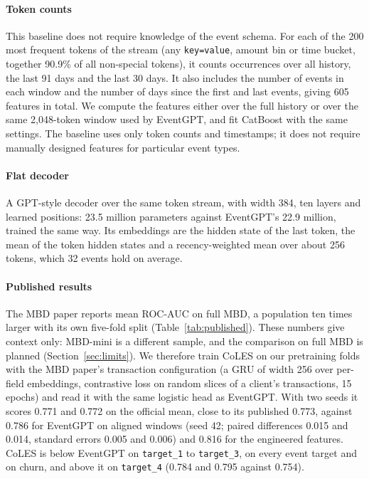 \documentclass[12pt]{article}
\newcommand{\tok}[1]{\texttt{#1}}
\begin{document}
\paragraph{Token counts} This baseline does not require knowledge of the event schema. For each of the 200 most frequent tokens of the stream (any \tok{key=value}, amount bin or time bucket, together 90.9\% of all non-special tokens), it counts occurrences over all history, the last 91 days and the last 30 days. It also includes the number of events in each window and the number of days since the first and last events, giving 605 features in total. We compute the features either over the full history or over the same 2,048-token window used by EventGPT, and fit CatBoost with the same settings. The baseline uses only token counts and timestamps; it does not require manually designed features for particular event types.

\paragraph{Flat decoder} A GPT-style decoder over the same token stream, with width 384, ten layers and learned positions: 23.5 million parameters against EventGPT's 22.9 million, trained the same way. Its embeddings are the hidden state of the last token, the mean of the token hidden states and a recency-weighted mean over about 256 tokens, which 32 events hold on average.

\paragraph{Published results} The MBD paper reports mean ROC-AUC on full MBD, a population ten times larger with its own five-fold split (Table~\ref{tab:published}). These numbers give context only: MBD-mini is a different sample, and the comparison on full MBD is planned (Section~\ref{sec:limits}). We therefore train CoLES \cite{coles} on our pretraining folds with the MBD paper's transaction configuration (a GRU of width 256 over per-field embeddings, contrastive loss on random slices of a client's transactions, 15 epochs) and read it with the same logistic head as EventGPT. With two seeds it scores 0.771 and 0.772 on the official mean, close to its published 0.773, against 0.786 for EventGPT on aligned windows (seed 42; paired differences 0.015 and 0.014, standard errors 0.005 and 0.006) and 0.816 for the engineered features. CoLES is below EventGPT on \tok{target\_1} to \tok{target\_3}, on every event target and on churn, and above it on \tok{target\_4} (0.784 and 0.795 against 0.754).
\end{document}
